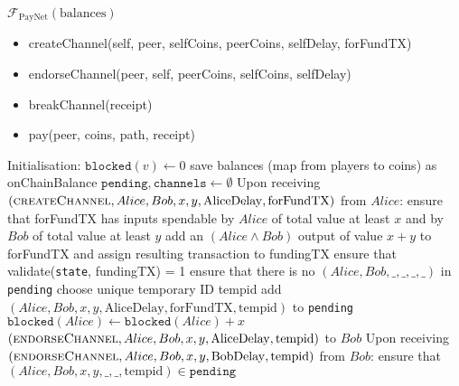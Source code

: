 \begin{functionality}{$\mathcal{F}_{\mathrm{PayNet}}
\left(\mathrm{balances}\right)$}
  \label{alg:payfunc}
    \begin{itemize}
      \item createChannel(self, peer, selfCoins, peerCoins, selfDelay, forFundTX)
      \item endorseChannel(peer, self, peerCoins, selfCoins, selfDelay)
      \item breakChannel(receipt)
      \item pay(peer, coins, path, receipt)
    \end{itemize}
  \begin{algorithmic}[1]
    \State Initialisation:
      \Indent
        \State $\mathtt{blocked}\left(v\right) \gets 0$
      \EndFor
      \State save balances (map from players to coins) as onChainBalance
      \State $\mathtt{pending}, \mathtt{channels} \gets \emptyset$
      \EndIndent
    \State
    \State Upon receiving $\left(\textsc{createChannel}, Alice, Bob, x, y,
    \mathrm{AliceDelay}, \mathrm{forFundTX}\right)$ from $Alice$:
    \Indent
      \State ensure that forFundTX has inputs spendable by $Alice$ of total
      value at least $x$ and by $Bob$ of total value at least $y$
      \State add an $\left(Alice \wedge Bob\right)$ output of value $x + y$ to
      forFundTX and assign resulting transaction to fundingTX
      \State ensure that validate(\texttt{state}, fundingTX) = 1
      \State ensure that there is no $\left(Alice, Bob, \_, \_, \_, \_\right)$
      in \texttt{pending}
      \State choose unique temporary ID tempid
      \State add $\left(Alice, Bob, x, y, \mathrm{AliceDelay},
      \mathrm{forFundTX}, \mathrm{tempid}\right)$ to \texttt{pending}
      \State $\mathtt{blocked}\left(Alice\right) \leftarrow
      \mathtt{blocked}\left(Alice\right) + x$
      \State \Return $\left(\textsc{endorseChannel}, Alice, Bob, x, y,
      \mathrm{AliceDelay}, \mathrm{tempid}\right)$ to $Bob$ 
    \EndIndent
    \State
    \State Upon receiving $\left(\textsc{endorseChannel}, Alice, Bob, x, y,
    \mathrm{BobDelay}, \mathrm{tempid}\right)$ from $Bob$: 
    \Indent
      \State ensure that $\left(Alice, Bob, x, y, \_, \_, \mathrm{tempid}\right)
      \in \mathtt{pending}$

\end{algorithmic}
\end{functionality}
